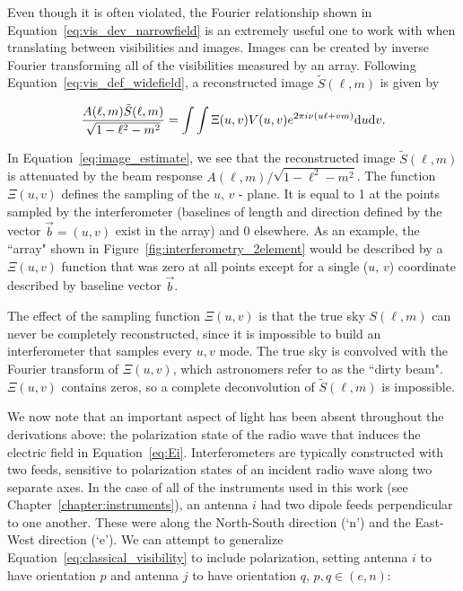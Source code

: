 Even though it is often violated, the Fourier relationship shown in Equation~\ref{eq:vis_dev_narrowfield} is an extremely useful one to work with when translating between visibilities and images. Images can be created by inverse Fourier transforming all of the visibilities measured by an array. Following Equation~\ref{eq:vis_def_widefield}, a reconstructed image $\tilde{S}(\ell, m)$ is given by

\begin{equation}
\frac{A(\ell, m)\tilde{S}(\ell, m)}{\sqrt{1 - \ell^2 - m^2}} = \int\int \Xi(u, v) V(u,v) e^{2\pi i \nu (u\ell + vm)} {\rm d}u {\rm d}v.
\label{eq:image_estimate}
\end{equation}

In Equation~\ref{eq:image_estimate}, we see that the reconstructed image $\tilde{S}(\ell, m)$ is attenuated by the beam response $A(\ell, m)/\sqrt{1 - \ell^2 - m^2}$. The function $\Xi(u, v)$ defines the sampling of the $u,\,v$ - plane. It is equal to 1 at the points sampled by the interferometer (baselines of length and direction defined by the vector  $\vec{b} = (u,v)$ exist in the array) and 0 elsewhere. As an example, the ``array" shown in Figure~\ref{fig:interferometry_2element} would be described by a $\Xi(u, v)$ function that was zero at all points except for a single ($u,\,v$) coordinate described by baseline vector $\vec{b}$.

The effect of the sampling function $\Xi(u, v)$ is that the true sky $S(\ell,m)$ can never be completely reconstructed, since it is impossible to build an interferometer that samples every $u,v$ mode. The true sky is convolved with the Fourier transform of $\Xi(u, v)$, which astronomers refer to as the ``dirty beam". $\Xi(u, v)$ contains zeros, so a complete deconvolution of $\tilde{S}(\ell, m)$ is impossible.

We now note that an important aspect of light has been absent throughout the derivations above: the polarization state of the radio wave that induces the electric field in Equation~\ref{eq:Ei}. Interferometers are typically constructed with two feeds, sensitive to polarization states of an incident radio wave along two separate axes. In the case of all of the instruments used in this work (see Chapter~\ref{chapter:instruments}), an antenna $i$ had two dipole feeds perpendicular to one another. These were along the North-South direction (`n') and the East-West direction (`e'). We can attempt to generalize Equation~\ref{eq:classical_visibility} to include polarization, setting antenna $i$ to have orientation $p$ and antenna $j$ to have orientation $q$, $p,q\in(e,n)$:

